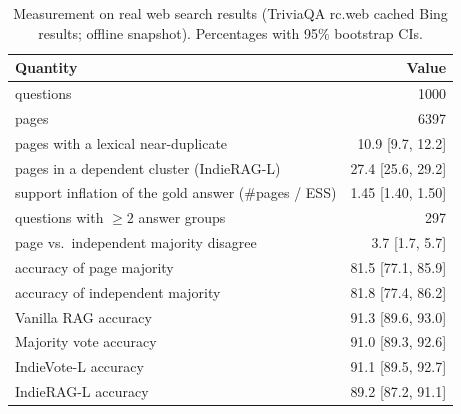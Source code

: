 \begin{table}[tbp]
\centering
\small
\caption{Measurement on real web search results (TriviaQA rc.web cached Bing results; offline snapshot). Percentages with 95\% bootstrap CIs.}
\label{tab:web}
\begin{tabular}{lr}
\toprule
Quantity & Value \\
\midrule
questions & 1000 \\
pages & 6397 \\
pages with a lexical near-duplicate & 10.9 [9.7, 12.2] \\
pages in a dependent cluster (IndieRAG-L) & 27.4 [25.6, 29.2] \\
support inflation of the gold answer (\#pages / ESS) & 1.45 [1.40, 1.50] \\
questions with $\geq2$ answer groups & 297 \\
page vs.\ independent majority disagree & 3.7 [1.7, 5.7] \\
accuracy of page majority & 81.5 [77.1, 85.9] \\
accuracy of independent majority & 81.8 [77.4, 86.2] \\
Vanilla RAG accuracy & 91.3 [89.6, 93.0] \\
Majority vote accuracy & 91.0 [89.3, 92.6] \\
IndieVote-L accuracy & 91.1 [89.5, 92.7] \\
IndieRAG-L accuracy & 89.2 [87.2, 91.1] \\
\bottomrule
\end{tabular}
\end{table}
